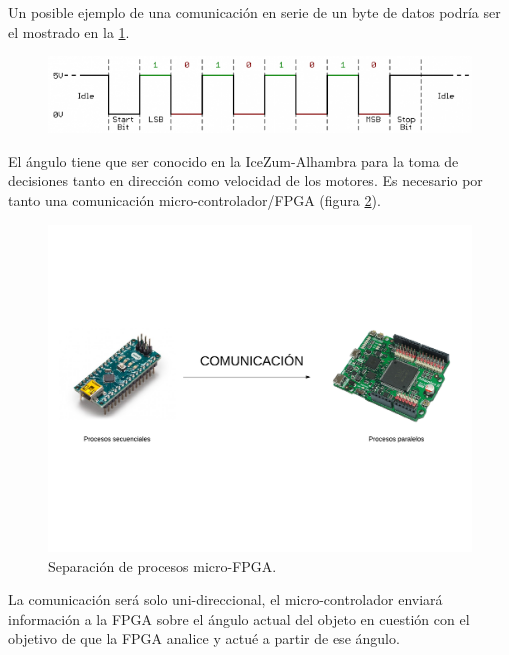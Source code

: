 Un posible ejemplo de una comunicación en serie de un byte de datos podría ser el mostrado en la \ref{fig:serial_comunicattion}. 

\begin{center}
	\begin{figure}[H]
		\center
		\includegraphics[scale=0.8, angle=0]{imagenes/Balancing_Robot/serial_comunicattion.png}
		\caption{}
		\label{fig:serial_comunicattion}
	\end{figure}
\end{center}

El ángulo tiene que ser conocido en la IceZum-Alhambra para la toma de decisiones tanto en dirección como velocidad de los motores. Es necesario por tanto una comunicación micro-controlador/FPGA (figura \ref{fig:coexistencia1}).

\begin{figure}[H]
	\center
	\includegraphics[trim = 0mm 40mm 0mm 20mm, clip,scale=0.4]{imagenes/Balancing_robot/coexistencia1.pdf}
	\caption{Separación de procesos micro-FPGA.}
	\label{fig:coexistencia1}
\end{figure}

La comunicación será solo uni-direccional, el micro-controlador enviará información a la FPGA sobre el ángulo actual del objeto en cuestión con el objetivo de que la FPGA analice y actué a partir de ese ángulo.\newline

